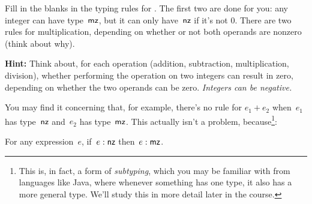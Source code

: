\documentclass{article}
\begin{document}
\begin{task}
  Fill in the blanks in the typing rules for {\ezlang}.
  The first two are done for you: any integer can have type~$\mathsf{mz}$, but
  it can only have~$\mathsf{nz}$ if it's not 0.
  There are two rules for multiplication, depending on whether or not both
  operands are nonzero (think about why).

  \textbf{Hint:} Think about, for each operation (addition, subtraction,
  multiplication, division), whether performing the
  operation on two integers
  can result in zero, depending on whether the two operands can be zero.
  {\em Integers can be negative.}

\end{task}

{
  \centering
  \def \MathparLineskip {\lineskip=0.43cm}
}

You may find it concerning that, for example, there's no rule for
$e_1 + e_2$ when~$e_1$ has type~$\mathsf{nz}$ and~$e_2$ has type~$\mathsf{mz}$.
%
This actually isn't a problem, because\footnote{This is, in fact, a form
  of {\em subtyping}, which you may be familiar with from languages like Java,
  where whenever something has one type, it also has a more general type.
  We'll study this in more detail later in the course.}:

\begin{thm}\label{thm:subtyping}
  For any expression~$e$, if~$e : \mathsf{nz}$ then~$e : \mathsf{mz}$.
\end{thm}
\end{document}
